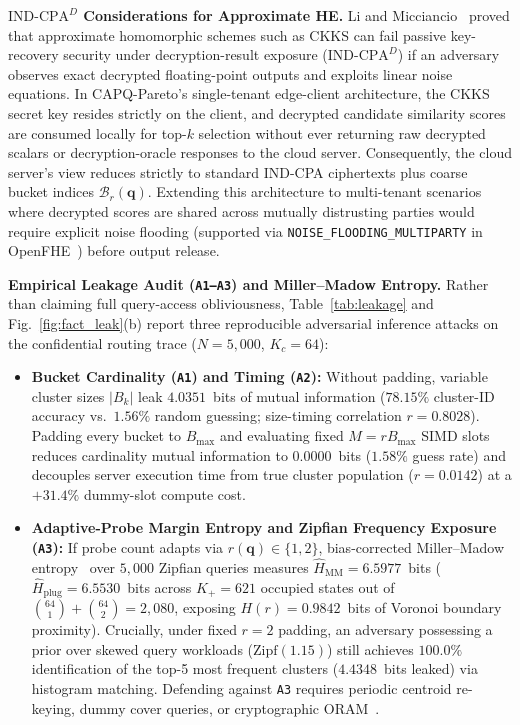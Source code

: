 \documentclass[10pt,journal,compsoc]{IEEEtran}
\begin{document}
\smallskip\noindent \textbf{$\text{IND-CPA}^D$ Considerations for Approximate HE.} Li and Micciancio~\cite{li2021indcpad} proved that approximate homomorphic schemes such as CKKS can fail passive key-recovery security under decryption-result exposure ($\text{IND-CPA}^D$) if an adversary observes exact decrypted floating-point outputs and exploits linear noise equations. In CAPQ-Pareto's single-tenant edge-client architecture, the CKKS secret key resides strictly on the client, and decrypted candidate similarity scores are consumed locally for top-$k$ selection without ever returning raw decrypted scalars or decryption-oracle responses to the cloud server. Consequently, the cloud server's view reduces strictly to standard IND-CPA ciphertexts plus coarse bucket indices $\mathcal{B}_r(\mathbf{q})$. Extending this architecture to multi-tenant scenarios where decrypted scores are shared across mutually distrusting parties would require explicit noise flooding (supported via \nolinkurl{NOISE_FLOODING_MULTIPARTY} in OpenFHE~\cite{albadawi2022openfhe}) before output release.



\smallskip\noindent \textbf{Empirical Leakage Audit (\texttt{A1--A3}) and Miller--Madow Entropy.} Rather than claiming full query-access obliviousness, Table~\ref{tab:leakage} and Fig.~\ref{fig:fact_leak}(b) report three reproducible adversarial inference attacks on the confidential routing trace ($N=5{,}000$, $K_c=64$):
\begin{itemize}
    \item \textbf{Bucket Cardinality (\texttt{A1}) and Timing (\texttt{A2}):} Without padding, variable cluster sizes $|B_k|$ leak $4.0351$~bits of mutual information ($78.15\%$ cluster-ID accuracy vs.\ $1.56\%$ random guessing; size-timing correlation $r=0.8028$). Padding every bucket to $B_{\max}$ and evaluating fixed $M=r B_{\max}$ SIMD slots reduces cardinality mutual information to $0.0000$~bits ($1.58\%$ guess rate) and decouples server execution time from true cluster population ($r=0.0142$) at a $+31.4\%$ dummy-slot compute cost.
    \item \textbf{Adaptive-Probe Margin Entropy and Zipfian Frequency Exposure (\texttt{A3}):} If probe count adapts via $r(\mathbf{q}) \in \{1,2\}$, bias-corrected Miller--Madow entropy~\cite{paninski2003entropy} over $5{,}000$ Zipfian queries measures $\hat{H}_{\text{MM}} = 6.5977$~bits ($\hat{H}_{\text{plug}} = 6.5530$~bits across $K_+=621$ occupied states out of $\binom{64}{1}+\binom{64}{2}=2{,}080$, exposing $H(r)=0.9842$~bits of Voronoi boundary proximity). Crucially, under fixed $r=2$ padding, an adversary possessing a prior over skewed query workloads ($\mathrm{Zipf}(1.15)$) still achieves $100.0\%$ identification of the top-5 most frequent clusters ($4.4348$~bits leaked) via histogram matching. Defending against \texttt{A3} requires periodic centroid re-keying, dummy cover queries, or cryptographic ORAM~\cite{chen2020sanns}.
\end{itemize}
\end{document}
